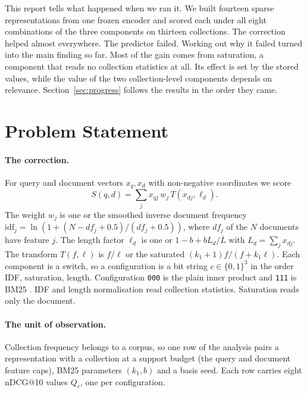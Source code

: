 \documentclass[11pt]{article}
\newcommand{\idf}{\mathrm{idf}}
\begin{document}
This report tells what happened when we ran it. We built fourteen sparse representations
from one frozen encoder and scored each under all eight combinations of the three
components on thirteen collections. The correction helped almost everywhere. The
predictor failed. Working out why it failed turned into the main finding so far. Most
of the gain comes from saturation, a component that reads no collection statistics at
all. Its effect is set by the stored values, while the value of the two collection-level
components depends on relevance. Section~\ref{sec:progress} follows the results in the order
they came.

\section{Problem Statement}
\label{sec:problem}

\paragraph{The correction.} For query and document vectors $x_q, x_d$ with
non-negative coordinates we score
\begin{equation}
S(q,d) = \sum_{j} x_{qj}\, w_j\, T(x_{dj}, \ell_d).
\label{eq:scorer}
\end{equation}
The weight $w_j$ is one or the smoothed inverse document frequency
$\idf_j = \ln(1 + (N - df_j + 0.5)/(df_j + 0.5))$, where $df_j$ of the $N$ documents have
feature $j$. The length factor $\ell_d$ is one or $1 - b + b L_d/\overline{L}$ with
$L_d = \sum_j x_{dj}$. The transform $T(f,\ell)$ is $f/\ell$ or the saturated
$(k_1+1)f/(f + k_1\ell)$. Each component is a switch, so a configuration is a bit string
$c \in \{0,1\}^3$ in the order IDF, saturation, length. Configuration \texttt{000} is
the plain inner product and \texttt{111} is BM25 \citep{robertson2009bm25}. IDF and
length normalisation read collection statistics. Saturation reads only the document.

\paragraph{The unit of observation.} Collection frequency belongs to a corpus, so one
row of the analysis pairs a representation with a collection at a support budget (the
query and document feature caps), BM25 parameters $(k_1, b)$ and a basis seed. Each row
carries eight nDCG@10 values $Q_c$, one per configuration.
\end{document}
